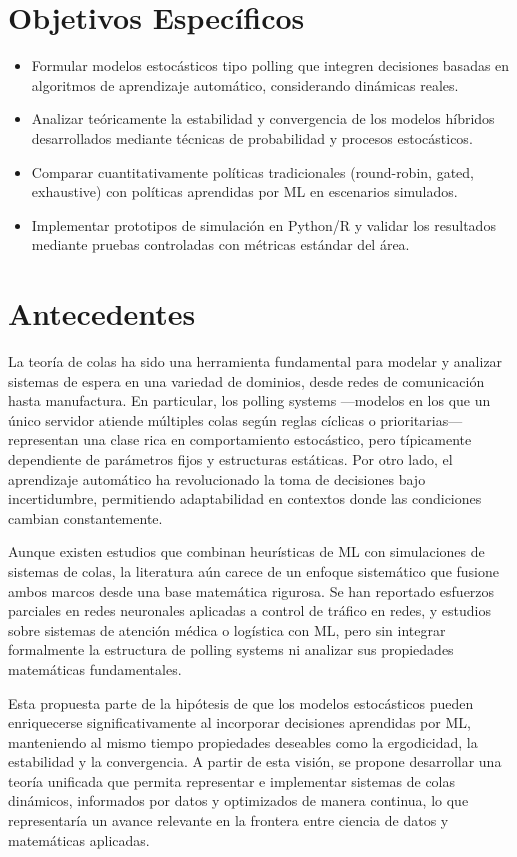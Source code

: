 \documentclass[12pt]{article}
\begin{document}
\section*{Objetivos Específicos}
\begin{itemize}
  \item Formular modelos estocásticos tipo polling que integren decisiones basadas en algoritmos de aprendizaje automático, considerando dinámicas reales.
  \item Analizar teóricamente la estabilidad y convergencia de los modelos híbridos desarrollados mediante técnicas de probabilidad y procesos estocásticos.
  \item Comparar cuantitativamente políticas tradicionales (round-robin, gated, exhaustive) con políticas aprendidas por ML en escenarios simulados.
  \item Implementar prototipos de simulación en Python/R y validar los resultados mediante pruebas controladas con métricas estándar del área.
\end{itemize}

\section*{Antecedentes}
La teoría de colas ha sido una herramienta fundamental para modelar y analizar sistemas de espera en una variedad de dominios, desde redes de comunicación hasta manufactura. En particular, los polling systems —modelos en los que un único servidor atiende múltiples colas según reglas cíclicas o prioritarias— representan una clase rica en comportamiento estocástico, pero típicamente dependiente de parámetros fijos y estructuras estáticas. Por otro lado, el aprendizaje automático ha revolucionado la toma de decisiones bajo incertidumbre, permitiendo adaptabilidad en contextos donde las condiciones cambian constantemente.

Aunque existen estudios que combinan heurísticas de ML con simulaciones de sistemas de colas, la literatura aún carece de un enfoque sistemático que fusione ambos marcos desde una base matemática rigurosa. Se han reportado esfuerzos parciales en redes neuronales aplicadas a control de tráfico en redes, y estudios sobre sistemas de atención médica o logística con ML, pero sin integrar formalmente la estructura de polling systems ni analizar sus propiedades matemáticas fundamentales. 

Esta propuesta parte de la hipótesis de que los modelos estocásticos pueden enriquecerse significativamente al incorporar decisiones aprendidas por ML, manteniendo al mismo tiempo propiedades deseables como la ergodicidad, la estabilidad y la convergencia. A partir de esta visión, se propone desarrollar una teoría unificada que permita representar e implementar sistemas de colas dinámicos, informados por datos y optimizados de manera continua, lo que representaría un avance relevante en la frontera entre ciencia de datos y matemáticas aplicadas.
\end{document}
